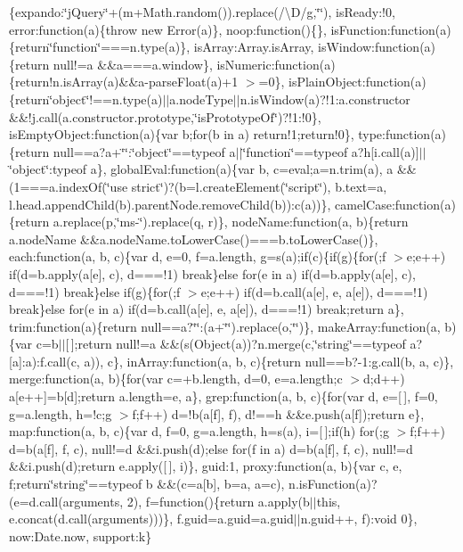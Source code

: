 {\begin{DoxyParamCaption}
\item[{}]{\{expando\+:\char`\"{}j\+Query\char`\"{}+(m+\+Math.\+random()).\+replace(/\textbackslash{}\+D/g,\char`\"{}\char`\"{}), is\+Ready\+:!0, error\+:function(a)\{throw new Error(a)\}, noop\+:function()\{\}, is\+Function\+:function(a)\{return\char`\"{}function\char`\"{}===n.\+type(a)\}, is\+Array\+:\+Array.\+is\+Array, is\+Window\+:function(a)\{return null!=a \&\&a===a.\+window\}, is\+Numeric\+:function(a)\{return!n.\+is\+Array(a)\&\&a-\/parse\+Float(a)+1 $>$=0\}, is\+Plain\+Object\+:function(a)\{return\char`\"{}object\char`\"{}!==n.\+type(a)$\vert$$\vert$a.\+node\+Type$\vert$$\vert$n.\+is\+Window(a)?!1\+:a.\+constructor \&\&!j.\+call(a.\+constructor.\+prototype,\char`\"{}is\+Prototype\+Of\char`\"{})?!1\+:!0\}, is\+Empty\+Object\+:function(a)\{var b;for(b in a) return!1;return!0\}, type\+:function(a)\{return null==a?a+\char`\"{}\char`\"{}\+:\char`\"{}object\char`\"{}==typeof a$\vert$$\vert$\char`\"{}function\char`\"{}==typeof a?h\mbox{[}i.\+call(a)\mbox{]}$\vert$$\vert$\char`\"{}object\char`\"{}\+:typeof a\}, global\+Eval\+:function(a)\{var b, c=eval;a=n.\+trim(a), a \&\&(1===a.\+index\+Of(\char`\"{}use strict\char`\"{})?(b=l.\+create\+Element(\char`\"{}script\char`\"{}), b.\+text=a, l.\+head.\+append\+Child(b).\+parent\+Node.\+remove\+Child(b))\+:c(a))\}, camel\+Case\+:function(a)\{return a.\+replace(p,\char`\"{}ms-\/\char`\"{}).\+replace(q, r)\}, node\+Name\+:function(a, b)\{return a.\+node\+Name \&\&a.\+node\+Name.\+to\+Lower\+Case()===b.\+to\+Lower\+Case()\}, each\+:function(a, b, c)\{var d, e=0, f=a.\+length, g=s(a);if(c)\{if(g)\{for(;f $>$e;e++) if(d=b.\+apply(a\mbox{[}e\mbox{]}, c), d===!1) break\}else for(e in a) if(d=b.\+apply(a\mbox{[}e\mbox{]}, c), d===!1) break\}else if(g)\{for(;f $>$e;e++) if(d=b.\+call(a\mbox{[}e\mbox{]}, e, a\mbox{[}e\mbox{]}), d===!1) break\}else for(e in a) if(d=b.\+call(a\mbox{[}e\mbox{]}, e, a\mbox{[}e\mbox{]}), d===!1) break;return a\}, trim\+:function(a)\{return null==a?\char`\"{}\char`\"{}\+:(a+\char`\"{}\char`\"{}).\+replace(o,\char`\"{}\char`\"{})\}, make\+Array\+:function(a, b)\{var c=b$\vert$$\vert$\mbox{[}$\,$\mbox{]};return null!=a \&\&(s(\+Object(a))?n.\+merge(c,\char`\"{}string\char`\"{}==typeof a?\mbox{[}a\mbox{]}\+:a)\+:f.\+call(c, a)), c\}, in\+Array\+:function(a, b, c)\{return null==b?-\/1\+:g.\+call(b, a, c)\}, merge\+:function(a, b)\{for(var c=+b.\+length, d=0, e=a.\+length;c $>$d;d++) a\mbox{[}e++\mbox{]}=b\mbox{[}d\mbox{]};return a.\+length=e, a\}, grep\+:function(a, b, c)\{for(var d, e=\mbox{[}$\,$\mbox{]}, f=0, g=a.\+length, h=!c;g $>$f;f++) d=!b(a\mbox{[}f\mbox{]}, f), d!==h \&\&e.\+push(a\mbox{[}f\mbox{]});return e\}, map\+:function(a, b, c)\{var d, f=0, g=a.\+length, h=s(a), i=\mbox{[}$\,$\mbox{]};if(h) for(;g $>$f;f++) d=b(a\mbox{[}f\mbox{]}, f, c), null!=d \&\&i.\+push(d);else for(f in a) d=b(a\mbox{[}f\mbox{]}, f, c), null!=d \&\&i.\+push(d);return e.\+apply(\mbox{[}$\,$\mbox{]}, i)\}, guid\+:1, proxy\+:function(a, b)\{var c, e, f;return\char`\"{}string\char`\"{}==typeof b \&\&(c=a\mbox{[}b\mbox{]}, b=a, a=c), n.\+is\+Function(a)?(e=d.\+call(arguments, 2), f=function()\{return a.\+apply(b$\vert$$\vert$this, e.\+concat(d.\+call(arguments)))\}, f.\+guid=a.\+guid=a.\+guid$\vert$$\vert$n.\+guid++, f)\+:void 0\}, now\+:\+Date.\+now, support\+:k\}}

\end{DoxyParamCaption}}
